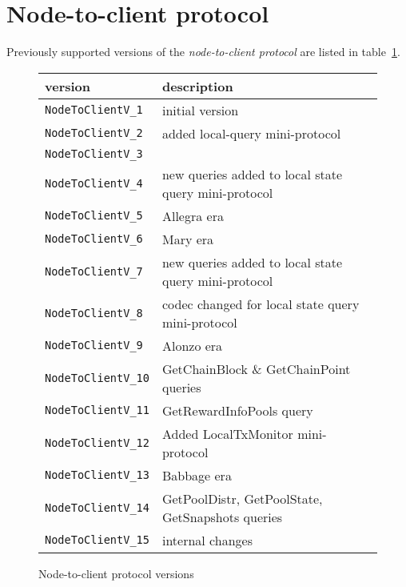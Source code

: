 \documentclass{report}
\newcommand{\header}[1]{\textbf{#1}}
\begin{document}
\section{Node-to-client protocol}
Previously supported versions of the \textit{node-to-client protocol} are listed
in table~\ref{table:historical-node-to-client-protocol-versions}.
\begin{figure}[h]
  \begin{center}
    \begin{tabular}{l|l}
      \header{version}           & \header{description} \\\hline
      \texttt{NodeToClientV\_1}  & initial version\\
      \texttt{NodeToClientV\_2}  & added local-query mini-protocol\\
      \texttt{NodeToClientV\_3}  & \\
      \texttt{NodeToClientV\_4}  & new queries added to local state query mini-protocol\\
      \texttt{NodeToClientV\_5}  & Allegra era \\
      \texttt{NodeToClientV\_6}  & Mary era \\
      \texttt{NodeToClientV\_7}  & new queries added to local state query mini-protocol\\
      \texttt{NodeToClientV\_8}  & codec changed for local state query mini-protocol\\
      \texttt{NodeToClientV\_9}  & Alonzo era \\
      \texttt{NodeToClientV\_10} & GetChainBlock \& GetChainPoint queries \\
      \texttt{NodeToClientV\_11} & GetRewardInfoPools query \\
      \texttt{NodeToClientV\_12} & Added LocalTxMonitor mini-protocol \\
      \texttt{NodeToClientV\_13} & Babbage era \\
      \texttt{NodeToClientV\_14} & GetPoolDistr, GetPoolState, GetSnapshots queries \\
      \texttt{NodeToClientV\_15} & internal changes \\
    \end{tabular}
    \caption{Node-to-client protocol versions}
    \label{table:historical-node-to-client-protocol-versions}
  \end{center}
\end{figure}



\end{document}
